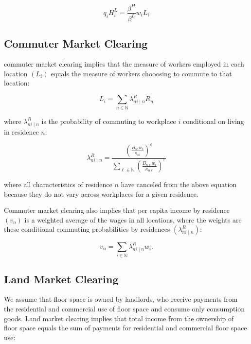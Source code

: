\begin{equation}
    q_i H_i^L = \frac{\beta^H}{\beta^L} w_i L_i
\end{equation}

\subsection{Commuter Market Clearing}

commuter market clearing implies that the measure of workers employed in each location $(L_i)$ equals the measure of workers chooosing to commute to that location:

\begin{equation}
    L_i = \sum_{n \in \mathbb{N}} \lambda_{ni \mid n}^R R_n
\end{equation}

where $\lambda_{ni \mid n}^R$ is the probability of commuting to workplace $i$ conditional on living in residence $n$:

\begin{equation}
    \lambda_{ni \mid n}^R = \frac{ \left(\frac{B_{ni} w_i}{\kappa_{ni}}\right)^{\varepsilon}}{\sum_{\ell \in \mathbb{N}} \left(\frac{B_{n\ell} w_{\ell}}{\kappa_{n\ell}}\right)^{\varepsilon}}
\end{equation}

where all characteristics of residence $n$ have canceled from the above equation because they do not vary across workplaces for a given residence.

Commuter market clearing also implies that per capita income by residence $(v_n)$ is a weighted average of the wages in all locations, where the weights are these conditional commuting probabilities by residences $(\lambda_{ni \mid n}^R)$:

\begin{equation}
    v_n = \sum_{i \in \mathbb{N}} \lambda_{ni \mid n}^R w_i.
\end{equation}

\subsection{Land Market Clearing}

We assume that floor space is owned by landlords, who receive payments from the residential and commercial use of floor space and consume only consumption goods. Land market clearing implies that total income from the ownership of floor space equals the sum of payments for residential and commercial floor space use:


